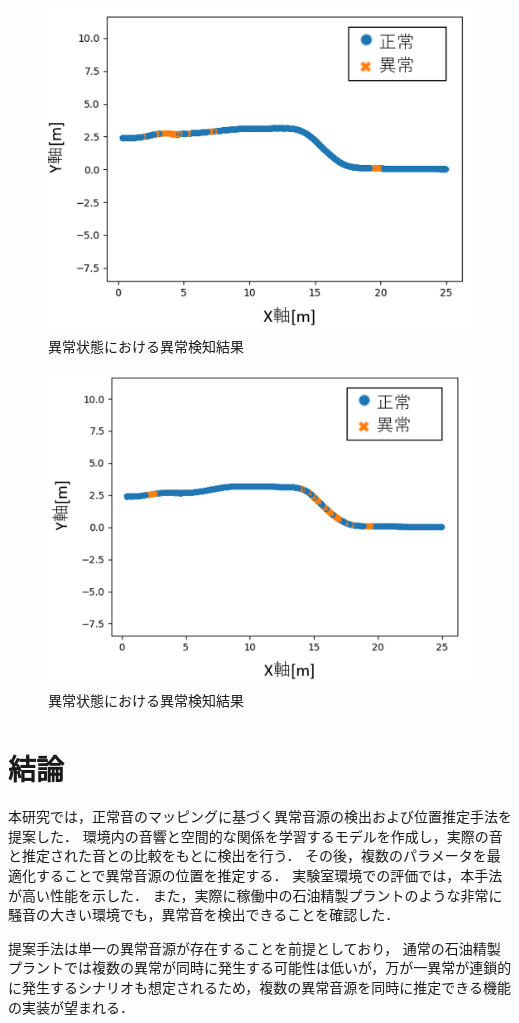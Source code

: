 \documentclass{/workdir/classes/summary}
\begin{document}
\begin{figure}[t]
  \centering
  \includegraphics[keepaspectratio, width=1.0\linewidth]{field_abnormal.png}
  \caption{異常状態における異常検知結果}
  \label{fig:field_abnormal1}
\end{figure}

\begin{figure}[t]
  \centering
  \includegraphics[keepaspectratio, width=1.0\linewidth]{field_abnormal1.png}
  \caption{異常状態における異常検知結果}
  \label{fig:field_abnormal}
\end{figure}


\section{結論}
本研究では，正常音のマッピングに基づく異常音源の検出および位置推定手法を提案した． 環境内の音響と空間的な関係を学習するモデルを作成し，実際の音と推定された音との比較をもとに検出を行う． その後，複数のパラメータを最適化することで異常音源の位置を推定する． 実験室環境での評価では，本手法が高い性能を示した． また，実際に稼働中の石油精製プラントのような非常に騒音の大きい環境でも，異常音を検出できることを確認した．

提案手法は単一の異常音源が存在することを前提としており， 通常の石油精製プラントでは複数の異常が同時に発生する可能性は低いが，万が一異常が連鎖的に発生するシナリオも想定されるため，複数の異常音源を同時に推定できる機能の実装が望まれる．


\end{document}
